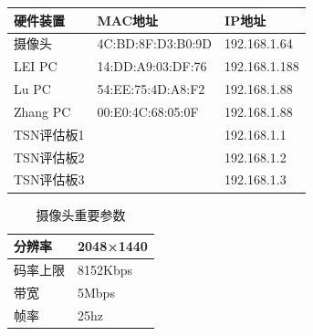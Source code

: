\begin{table}[h]
\begin{center}
\begin{tabular}{lll}
\hline \hline
硬件装置     & MAC地址             & IP地址          \\ \hline
摄像头      & 4C:BD:8F:D3:B0:9D & 192.168.1.64  \\ \hline
LEI PC   & 14:DD:A9:03:DF:76 & 192.168.1.188 \\ \hline
Lu PC    & 54:EE:75:4D:A8:F2 & 192.168.1.88  \\ \hline
Zhang PC & 00:E0:4C:68:05:0F & 192.168.1.88  \\ \hline
TSN评估板1  &                   & 192.168.1.1   \\ \hline
TSN评估板2  &                   & 192.168.1.2   \\ \hline
TSN评估板3  &                   & 192.168.1.3  \\ \hline \hline
\end{tabular}
\end{center}
\end{table}

\begin{table}[b]
\begin{center}
\begin{tabular}{p{2cm}p{2cm}}
\hline \hline
分辨率  & 2048×1440 \\ \hline
码率上限 & 8152Kbps  \\ \hline
带宽   & 5Mbps     \\ \hline
帧率   & 25hz      \\ \hline \hline
\end{tabular}
\caption{摄像头重要参数}
\end{center}
\end{table}

